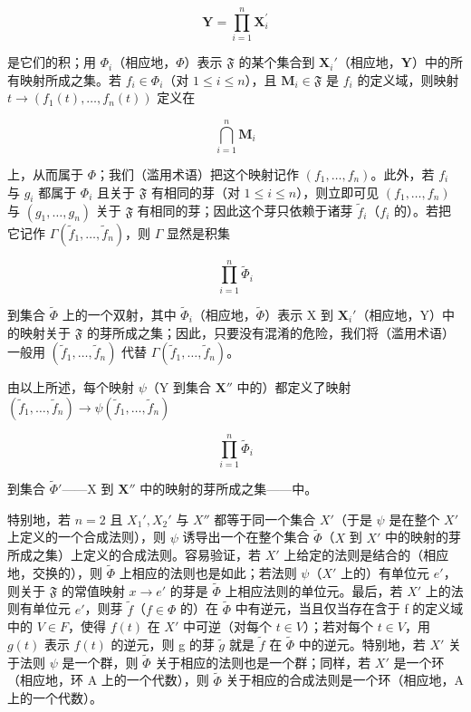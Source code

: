 \[
\mathbf {Y} = \prod_ {i = 1} ^ {n} \mathbf {X} _ {i} ^ {\prime}
\]

是它们的积；用 \(\Phi_i\)（相应地，\(\Phi\)）表示 \(\mathfrak{F}\) 的某个集合到 \(\mathbf{X}_i'\)（相应地，\(\mathbf{Y}\)）中的所有映射所成之集。若 \(f_i \in \Phi_i\)（对 \(1 \leqslant i \leqslant n\)），且 \(\mathbf{M}_i \in \mathfrak{F}\) 是 \(f_i\) 的定义域，则映射 \(t \to (f_1(t), \ldots, f_n(t))\) 定义在

\[
\bigcap_ {i = 1} ^ {n} \mathbf {M} _ {i}
\]

上，从而属于 \(\Phi\)；我们（滥用术语）把这个映射记作 \((f_1, \ldots, f_n)\)。此外，若 \(f_i\) 与 \(g_i\) 都属于 \(\Phi_i\) 且关于 \(\mathfrak{F}\) 有相同的芽（对 \(1 \leqslant i \leqslant n\)），则立即可见 \((f_1, \ldots, f_n)\) 与 \((g_1, \ldots, g_n)\) 关于 \(\mathfrak{F}\) 有相同的芽；因此这个芽只依赖于诸芽 \(\tilde{f}_i\)（\(f_i\) 的）。若把它记作 \(\Gamma(\tilde{f}_1, \ldots, \tilde{f}_n)\)，则 \(\Gamma\) 显然是积集

\[
\prod_ {i = 1} ^ {n} \tilde {\Phi} _ {i}
\]

到集合 \(\tilde{\Phi}\) 上的一个双射，其中 \(\tilde{\Phi}_i\)（相应地，\(\tilde{\Phi}\)）表示 X 到 \(\mathbf{X}_i'\)（相应地，Y）中的映射关于 \(\mathfrak{F}\) 的芽所成之集；因此，只要没有混淆的危险，我们将（滥用术语）一般用 \((\tilde{f}_1, \ldots, \tilde{f}_n)\) 代替 \(\Gamma(\tilde{f}_1, \ldots, \tilde{f}_n)\)。

由以上所述，每个映射 \(\psi\)（Y 到集合 \(\mathbf{X}''\) 中的）都定义了映射 \((\tilde{f}_1, \ldots, \tilde{f}_n) \to \psi(\tilde{f}_1, \ldots, \tilde{f}_n)\)

\[
\prod_ {i = 1} ^ {n} \tilde {\Phi} _ {i}
\]

到集合 \(\tilde{\Phi}'\)——X 到 \(\mathbf{X}''\) 中的映射的芽所成之集——中。

特别地，若 \(n = 2\) 且 \(X_1', X_2'\) 与 \(X''\) 都等于同一个集合 \(X'\)（于是 \(\psi\) 是在整个 \(X'\) 上定义的一个合成法则），则 \(\psi\) 诱导出一个在整个集合 \(\tilde{\Phi}\)（\(X\) 到 \(X'\) 中的映射的芽所成之集）上定义的合成法则。容易验证，若 \(X'\) 上给定的法则是结合的（相应地，交换的），则 \(\tilde{\Phi}\) 上相应的法则也是如此；若法则 \(\psi\)（\(X'\) 上的）有单位元 \(e'\)，则关于 \(\mathfrak{F}\) 的常值映射 \(x \to e'\) 的芽是 \(\tilde{\Phi}\) 上相应法则的单位元。最后，若 \(X'\) 上的法则有单位元 \(e'\)，则芽 \(\tilde{f}\)（\(f \in \Phi\) 的）在 \(\tilde{\Phi}\) 中有逆元，当且仅当存在含于 f 的定义域中的 \(V \in F\)，使得 \(f(t)\) 在 \(X'\) 中可逆（对每个 \(t \in V\)）；若对每个 \(t \in V\)，用 \(g(t)\) 表示 \(f(t)\) 的逆元，则 g 的芽 \(\tilde{g}\) 就是 \(\tilde{f}\) 在 \(\tilde{\Phi}\) 中的逆元。特别地，若 \(X'\) 关于法则 \(\psi\) 是一个群，则 \(\tilde{\Phi}\) 关于相应的法则也是一个群；同样，若 \(X'\) 是一个环（相应地，环 A 上的一个代数），则 \(\tilde{\Phi}\) 关于相应的合成法则是一个环（相应地，A 上的一个代数）。

